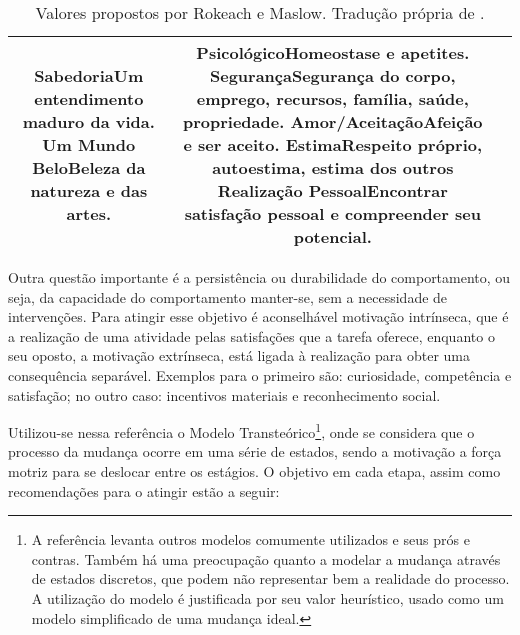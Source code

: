 \begin{table}[h!t]
{\begin{tabular}{ccc}
{\textbf{Sabedoria}\newline Um entendimento maduro da vida. \newline
\textbf{Um Mundo Belo}\newline Beleza da natureza e das artes.
} &
\multicolumn{1}{m{6cm}|}{
\textbf{Psicológico}\newline Homeostase e apetites. \newline
\textbf{Segurança}\newline Segurança do corpo, emprego, recursos, família, saúde,
propriedade. \newline
\textbf{Amor/Aceitação}\newline Afeição e ser aceito. \newline
\textbf{Estima}\newline Respeito próprio, autoestima, estima dos outros \newline
\textbf{Realização Pessoal}\newline Encontrar satisfação pessoal e compreender seu
potencial.
} \\
\hline
\end{tabular}
}
\caption[Valores propostos por Rokeach e Maslow.]
{Valores propostos por Rokeach e Maslow. Tradução própria de
\cite[pp. 928]{2010_aspectos_psicologicos_usa}.}
\label{tab:valores}
\end{table}

Outra questão importante é a persistência ou durabilidade do
comportamento, ou seja, da capacidade do comportamento manter-se, sem
a necessidade de intervenções.  Para atingir esse objetivo é
aconselhável motivação intrínseca, que é a realização de uma atividade
pelas satisfações que a tarefa oferece, enquanto o seu oposto, a
motivação extrínseca, está ligada à realização para obter uma
consequência separável. Exemplos para o primeiro são: curiosidade,
competência e satisfação; no outro caso: incentivos materiais e
reconhecimento social.

Utilizou-se nessa referência o Modelo Transteórico\footnote{A referência
levanta outros modelos comumente utilizados e seus prós e contras.
Também há uma preocupação quanto a modelar a mudança através de
estados discretos, que podem não representar bem a realidade do
processo. A utilização do modelo é justificada por seu valor
heurístico, usado como um modelo simplificado de uma mudança ideal.},
onde se considera que o processo da mudança ocorre em uma série de
estados, sendo a motivação a força motriz para se deslocar entre os
estágios. O objetivo em cada etapa, assim como recomendações para o
atingir estão a seguir:

